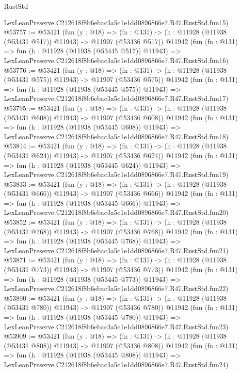 \begin{lexlean}{RustStd}
\begin{coremodule}
    LexLeanPreserve.C212618f8b6ebac3a5c1e1dd0896866e7.R47.RustStd.fun15)
@53757 := @53421
    (fun (y : @18) =>
    (fn : @131) -> (h : @11928 (@11938 (@53431 @517)) @11943) -> @11907 (@53436 @517))
    @11942
    (fun (fn : @131) =>
    fun (h : @11928 (@11938 (@53445 @517)) @11943) =>
    LexLeanPreserve.C212618f8b6ebac3a5c1e1dd0896866e7.R47.RustStd.fun16)
@53776 := @53421
    (fun (y : @18) =>
    (fn : @131) -> (h : @11928 (@11938 (@53431 @575)) @11943) -> @11907 (@53436 @575))
    @11942
    (fun (fn : @131) =>
    fun (h : @11928 (@11938 (@53445 @575)) @11943) =>
    LexLeanPreserve.C212618f8b6ebac3a5c1e1dd0896866e7.R47.RustStd.fun17)
@53795 := @53421
    (fun (y : @18) =>
    (fn : @131) -> (h : @11928 (@11938 (@53431 @608)) @11943) -> @11907 (@53436 @608))
    @11942
    (fun (fn : @131) =>
    fun (h : @11928 (@11938 (@53445 @608)) @11943) =>
    LexLeanPreserve.C212618f8b6ebac3a5c1e1dd0896866e7.R47.RustStd.fun18)
@53814 := @53421
    (fun (y : @18) =>
    (fn : @131) -> (h : @11928 (@11938 (@53431 @624)) @11943) -> @11907 (@53436 @624))
    @11942
    (fun (fn : @131) =>
    fun (h : @11928 (@11938 (@53445 @624)) @11943) =>
    LexLeanPreserve.C212618f8b6ebac3a5c1e1dd0896866e7.R47.RustStd.fun19)
@53833 := @53421
    (fun (y : @18) =>
    (fn : @131) -> (h : @11928 (@11938 (@53431 @666)) @11943) -> @11907 (@53436 @666))
    @11942
    (fun (fn : @131) =>
    fun (h : @11928 (@11938 (@53445 @666)) @11943) =>
    LexLeanPreserve.C212618f8b6ebac3a5c1e1dd0896866e7.R47.RustStd.fun20)
@53852 := @53421
    (fun (y : @18) =>
    (fn : @131) -> (h : @11928 (@11938 (@53431 @768)) @11943) -> @11907 (@53436 @768))
    @11942
    (fun (fn : @131) =>
    fun (h : @11928 (@11938 (@53445 @768)) @11943) =>
    LexLeanPreserve.C212618f8b6ebac3a5c1e1dd0896866e7.R47.RustStd.fun21)
@53871 := @53421
    (fun (y : @18) =>
    (fn : @131) -> (h : @11928 (@11938 (@53431 @773)) @11943) -> @11907 (@53436 @773))
    @11942
    (fun (fn : @131) =>
    fun (h : @11928 (@11938 (@53445 @773)) @11943) =>
    LexLeanPreserve.C212618f8b6ebac3a5c1e1dd0896866e7.R47.RustStd.fun22)
@53890 := @53421
    (fun (y : @18) =>
    (fn : @131) -> (h : @11928 (@11938 (@53431 @780)) @11943) -> @11907 (@53436 @780))
    @11942
    (fun (fn : @131) =>
    fun (h : @11928 (@11938 (@53445 @780)) @11943) =>
    LexLeanPreserve.C212618f8b6ebac3a5c1e1dd0896866e7.R47.RustStd.fun23)
@53909 := @53421
    (fun (y : @18) =>
    (fn : @131) -> (h : @11928 (@11938 (@53431 @808)) @11943) -> @11907 (@53436 @808))
    @11942
    (fun (fn : @131) =>
    fun (h : @11928 (@11938 (@53445 @808)) @11943) =>
    LexLeanPreserve.C212618f8b6ebac3a5c1e1dd0896866e7.R47.RustStd.fun24)

\end{coremodule}
\end{lexlean}

